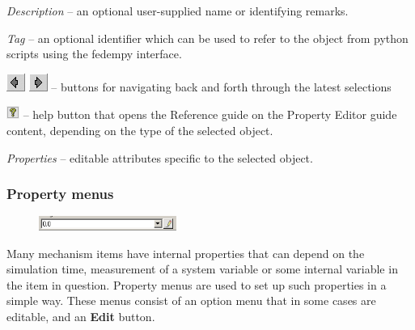 \begin{bulletlist}
\item{\sl Description} --
  an optional user-supplied name or identifying remarks.
\item{\sl Tag} --
  an optional identifier which can be used to refer to the object from
  python scripts using the fedempy interface.
\item\includegraphics[scale=0.5]{Figures/Icons/selectbackward}
  \includegraphics[scale=0.5]{Figures/Icons/selectforward} --
  buttons for navigating back and forth through the latest selections
\item\includegraphics[scale=2.0]{Figures/Icons/help} --
  help button that opens the Reference guide on the Property Editor guide
  content, depending on the type of the selected object.
\item{\sl Properties} --
  editable attributes specific to the selected object.
\end{bulletlist}




\subsubsection{Property menus}

\begin{figure}
  \includegraphics[width=0.4\textwidth]{Figures/2-PropertyValueMenu}
\end{figure}

Many mechanism items have internal properties that can depend on the
simulation time, measurement of a system variable or some internal
variable in the item in question. Property menus are used to
set up such properties in a simple way. These menus consist of
an option menu that in some cases are editable, and an \textbf{Edit} button.

